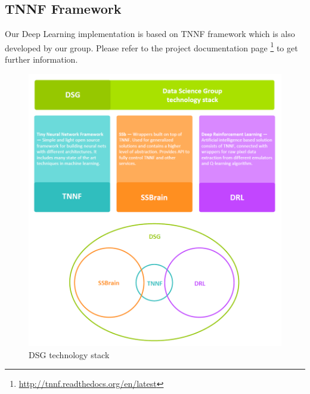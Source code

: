\documentclass[a4paper,oneside,dvipsnames]{article}
\begin{document}
\subsection[TNNF Framework]{TNNF Framework}
Our Deep Learning implementation is based on TNNF framework which is also developed by our group. Please refer to the project documentation page \footnote{\url{http://tnnf.readthedocs.org/en/latest}} to get further information.
\begin{figure}[h]
    \centering
    \includegraphics[scale=0.53]{DSG_tech_stack.png}
    \caption{DSG technology stack}
    \label{fig:tech_stack}
\end{figure}
\end{document}

